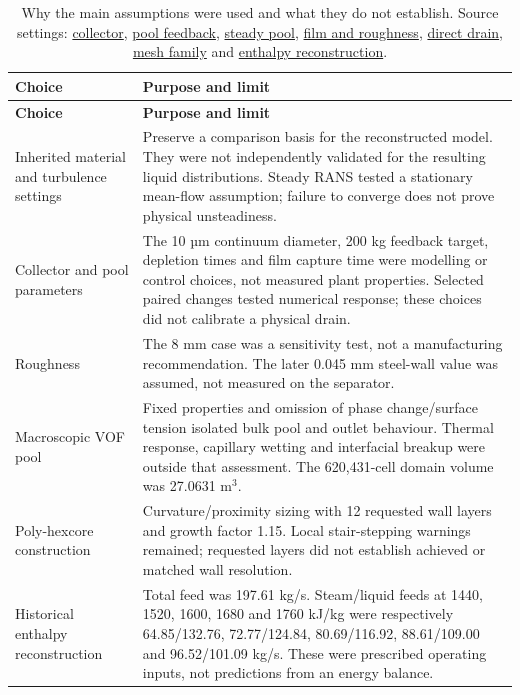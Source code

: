 \begin{longtable}{@{}>{\raggedright\arraybackslash}p{0.29000000\dimexpr\linewidth-2\tabcolsep\relax}>{\raggedright\arraybackslash}p{0.71000000\dimexpr\linewidth-2\tabcolsep\relax}@{}}
\caption{Why the main assumptions were used and what they do not establish. Source settings: \href{../../../../experiments/phase-07b-full-geometry-liquid-removal/s040-collector/setup.md}{collector}, \href{../../../../experiments/phase-06-full-geometry-with-brine-pool/results.md}{pool feedback}, \href{../../../../experiments/phase-09-steady-vof-pool/setup.md}{steady pool}, \href{../../../../experiments/phase-07-2a-wall-liquid-routing/stage-04-ewf-wall-parameters/commercial-steel/setup.md}{film and roughness}, \href{../../../../experiments/phase-07-2a-wall-liquid-routing/stage-04-ewf-wall-parameters/ewf-only-drain/setup.md}{direct drain}, \href{../../../../experiments/phase-10-single-inlet-mesh-convergence/setup.md}{mesh family} and \href{../../../../experiments/phase-10-single-inlet-mesh-convergence/replication-enthalpy-sweep.md}{enthalpy reconstruction}.}\label{tab:table-D.1}\\
\toprule
\textbf{Choice} & \textbf{Purpose and limit} \\
\midrule
\endfirsthead
\toprule
\textbf{Choice} & \textbf{Purpose and limit} \\
\midrule
\endhead
Inherited material and turbulence settings & Preserve a comparison basis for the reconstructed model. They were not independently validated for the resulting liquid distributions. Steady RANS tested a stationary mean-flow assumption; failure to converge does not prove physical unsteadiness. \\
Collector and pool parameters & The 10 µm continuum diameter, 200 kg feedback target, depletion times and film capture time were modelling or control choices, not measured plant properties. Selected paired changes tested numerical response; these choices did not calibrate a physical drain. \\
Roughness & The 8 mm case was a sensitivity test, not a manufacturing recommendation. The later 0.045 mm steel-wall value was assumed, not measured on the separator. \\
Macroscopic VOF pool & Fixed properties and omission of phase change/surface tension isolated bulk pool and outlet behaviour. Thermal response, capillary wetting and interfacial breakup were outside that assessment. The 620,431-cell domain volume was 27.0631 m\(^3\). \\
Poly-hexcore construction & Curvature/proximity sizing with 12 requested wall layers and growth factor 1.15. Local stair-stepping warnings remained; requested layers did not establish achieved or matched wall resolution. \\
Historical enthalpy reconstruction & Total feed was 197.61 kg/s. Steam/liquid feeds at 1440, 1520, 1600, 1680 and 1760 kJ/kg were respectively 64.85/132.76, 72.77/124.84, 80.69/116.92, 88.61/109.00 and 96.52/101.09 kg/s. These were prescribed operating inputs, not predictions from an energy balance. \\
\bottomrule
\end{longtable}

